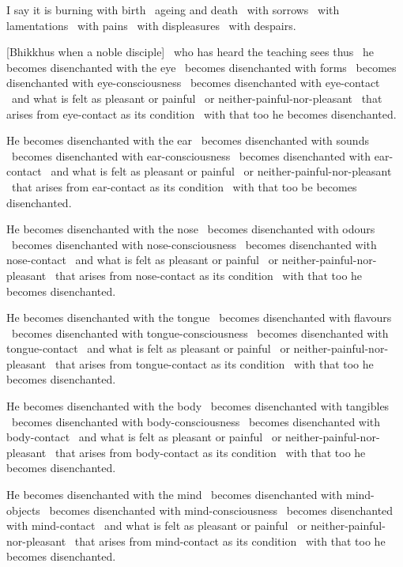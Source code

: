 I say it is burning with birth \breathmark\ ageing and death \breathmark\ with sorrows \breathmark\ with lamentations \breathmark\ with pains \breathmark\ with displeasures \breathmark\ with despairs.

[Bhikkhus when a noble disciple] \breathmark\ who has heard the teaching sees thus \breathmark\ he becomes disenchanted with the eye \breathmark\ becomes disenchanted with forms \breathmark\ becomes disenchanted with eye-consciousness \breathmark\ becomes disenchanted with eye-contact \breathmark\ and what is felt as pleasant or painful \breathmark\ or neither-painful-nor-pleasant \breathmark\ that arises from eye-contact as its condition \breathmark\ with that too he becomes disenchanted.

He becomes disenchanted with the ear \breathmark\ becomes disenchanted with sounds \breathmark\ becomes disenchanted with ear-consciousness \breathmark\ becomes disenchanted with ear-contact \breathmark\ and what is felt as pleasant or painful \breathmark\ or neither-painful-nor-pleasant \breathmark\ that arises from ear-contact as its condition \breathmark\ with that too be becomes disenchanted.

He becomes disenchanted with the nose \breathmark\ becomes disenchanted with odours \breathmark\ becomes disenchanted with nose-consciousness \breathmark\ becomes disenchanted with nose-contact \breathmark\ and what is felt as pleasant or painful \breathmark\ or neither-painful-nor-pleasant \breathmark\ that arises from nose-contact as its condition \breathmark\ with that too he becomes disenchanted.

He becomes disenchanted with the tongue \breathmark\ becomes disenchanted with flavours \breathmark\ becomes disenchanted with tongue-consciousness \breathmark\ becomes disenchanted with tongue-contact \breathmark\ and what is felt as pleasant or painful \breathmark\ or neither-painful-nor-pleasant \breathmark\ that arises from tongue-contact as its condition \breathmark\ with that too he becomes disenchanted.

He becomes disenchanted with the body \breathmark\ becomes disenchanted with tangibles \breathmark\ becomes disenchanted with body-consciousness \breathmark\ becomes disenchanted with body-contact \breathmark\ and what is felt as pleasant or painful \breathmark\ or neither-painful-nor-pleasant \breathmark\ that arises from body-contact as its condition \breathmark\ with that too he becomes disenchanted.

He becomes disenchanted with the mind \breathmark\ becomes disenchanted with mind-objects \breathmark\ becomes disenchanted with mind-consciousness \breathmark\ becomes disenchanted with mind-contact \breathmark\ and what is felt as pleasant or painful \breathmark\ or neither-painful-nor-pleasant \breathmark\ that arises from mind-contact as its condition \breathmark\ with that too he becomes disenchanted.

